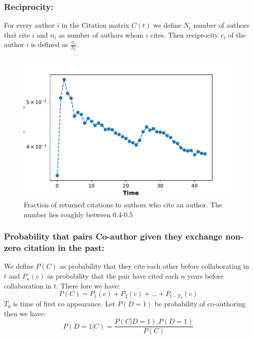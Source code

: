 \documentclass[aps, pre, twocolumn, nofootinbib]{revtex4-1}
\begin{document}
\subsubsection{Reciprocity:}
For every author $i$ in the Citation matrix $C(t)$ we define $N_i$ number of authors that cite $i$ and $n_i$ as number of authors whom $i$ cites. Then reciprocity $r_i$ of the author $i$ is defined as $\frac{n_i}{N_i}$. 

\begin{figure}
	\centering
	\includegraphics[scale = 0.45]{plots/rec}
	
	\captionsetup{singlelinecheck=false, justification=raggedright,  labelsep=space}
	\caption{Fraction of returned citations to authors who cite an author. The number lies roughly between 0.4-0.5}
	\label{freci}
\end{figure}
\subsubsection{Probability that pairs Co-author given they exchange non-zero citation in the past:}
We define $P(C)$ as probability that they cite each other before collaborating in  $t$ and $P_{n}(c)$ as probability that the pair have cited each $n$ years before collaboration in $t$. 
There fore we have:
\begin{equation}
P(C) = P_{1}(c) + P_{2}(c) + \dots + P_{t-T_0}(c) 
\end{equation}
$T_0$ is time of first co appearance. Let $P(D=1)$ be probability of co-authoring then we have:
\begin{equation}
P(D=1|C) = \frac{P(C|D=1).P(D=1)}{P(C)}
\end{equation}
\end{document}
